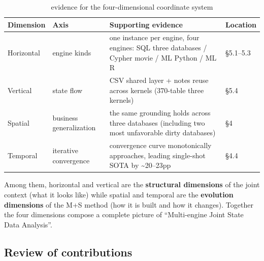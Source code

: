 \documentclass[11pt]{article}
\begin{document}
\begin{table}[htbp]
\centering
\caption{evidence for the four-dimensional coordinate system}
\label{tab:8}
\small
\begin{tabular}{@{}
  >{\raggedright\arraybackslash}p{}
  >{\raggedright\arraybackslash}p{}
  >{\raggedright\arraybackslash}p{}
  >{\raggedright\arraybackslash}p{}@{}}
\toprule
Dimension & Axis & Supporting evidence & Location \\
\midrule
Horizontal & engine kinds & one instance per engine, four engines: SQL three databases / Cypher movie / ML Python / ML R & \S{}5.1--5.3 \\
Vertical & state flow & CSV shared layer + notes reuse across kernels (370-table three kernels) & \S{}5.4 \\
Spatial & business generalization & the same grounding holds across three databases (including two most unfavorable dirty databases) & \S{}4 \\
Temporal & iterative convergence & convergence curve monotonically approaches, leading single-shot SOTA by \textasciitilde20--23pp & \S{}4.4 \\
\bottomrule
\end{tabular}
\end{table}

Among them, horizontal and vertical are the \textbf{structural dimensions} of the joint context (what it looks like) while spatial and temporal are the \textbf{evolution dimensions} of the M+S method (how it is built and how it changes). Together the four dimensions compose a complete picture of ``Multi-engine Joint State Data Analysis''.

\subsection{Review of contributions}
\end{document}

